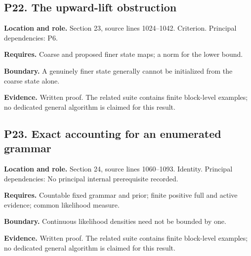 \documentclass[11pt,oneside,openany]{book}
\numberwithin{equation}{section}
\begin{document}
\par\noindent\begin{minipage}{\textwidth}
\subsection{P22. The upward-lift
obstruction}\label{LSMRegister:p22.-the-upward-lift-obstruction}

\textbf{Location and role.} Section 23, source lines 1024--1042.
Criterion. Principal dependencies: P6.

\textbf{Requires.} Coarse and proposed finer state maps; a norm for the
lower bound.

\textbf{Boundary.} A genuinely finer state generally cannot be
initialized from the coarse state alone.

\textbf{Evidence.} Written proof. The related suite contains finite
block-level examples; no dedicated general algorithm is claimed for this
result.
\end{minipage}\par\medskip

\par\noindent\begin{minipage}{\textwidth}
\subsection{P23. Exact accounting for an enumerated
grammar}\label{LSMRegister:p23.-exact-accounting-for-an-enumerated-grammar}

\textbf{Location and role.} Section 24, source lines 1060--1093.
Identity. Principal dependencies: No principal internal prerequisite
recorded.

\textbf{Requires.} Countable fixed grammar and prior; finite positive
full and active evidence; common likelihood measure.

\textbf{Boundary.} Continuous likelihood densities need not be bounded
by one.

\textbf{Evidence.} Written proof. The related suite contains finite
block-level examples; no dedicated general algorithm is claimed for this
result.
\end{minipage}\par\medskip
\end{document}
